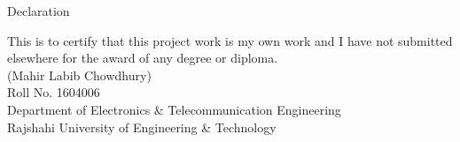 \begin{center}
    \begin{huge}
        Declaration
    \end{huge}
\end{center}
\vspace{2cm}
\begin{flushleft}
    This is to certify that this project work is my own work and I have not submitted elsewhere for the award of any degree or diploma.\\
    \vspace{4cm}
    (Mahir Labib Chowdhury)\\
    Roll No. 1604006\\
    Department of Electronics \& Telecommunication Engineering\\
    Rajshahi University of Engineering \& Technology\\
\end{flushleft}
\pagebreak